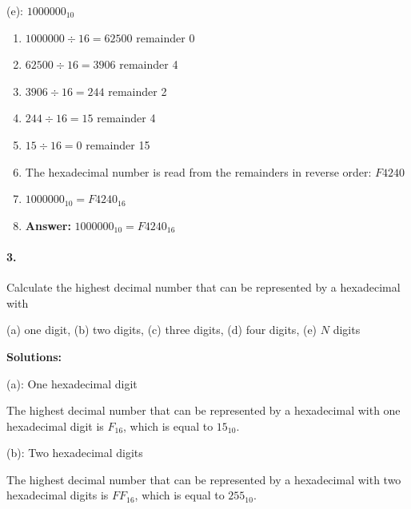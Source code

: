 \documentclass{article}
\begin{document}
\vspace*{0.5cm}

\noindent (e): $1000000_{10}$

\begin{enumerate}
    \item $1000000 \div 16 = 62500$ remainder 0
    \item $62500 \div 16 = 3906$ remainder 4
    \item $3906 \div 16 = 244$ remainder 2
    \item $244 \div 16 = 15$ remainder 4
    \item $15 \div 16 = 0$ remainder 15
    \item The hexadecimal number is read from the remainders in reverse order: $F4240$
    \item $1000000_{10} = F4240_{16}$
    \item \textbf{Answer:} $1000000_{10} = F4240_{16}$
\end{enumerate}

\paragraph*{3.}

Calculate the highest decimal number that can be represented by a hexadecimal with

(a) one digit, (b) two digits, (c) three digits, (d) four digits, (e) $N$ digits

\vspace*{0.5cm}

\noindent \textbf{Solutions:}

\vspace*{0.25cm}

\noindent (a): One hexadecimal digit

\vspace*{0.25cm}

\noindent The highest decimal number that can be represented by a hexadecimal with one hexadecimal digit is $F_{16}$, which is equal to $15_{10}$.

\vspace*{0.5cm}

\noindent (b): Two hexadecimal digits

\vspace*{0.25cm}

\noindent The highest decimal number that can be represented by a hexadecimal with two hexadecimal digits is $FF_{16}$, which is equal to $255_{10}$.

\vspace*{0.5cm}
\end{document}
